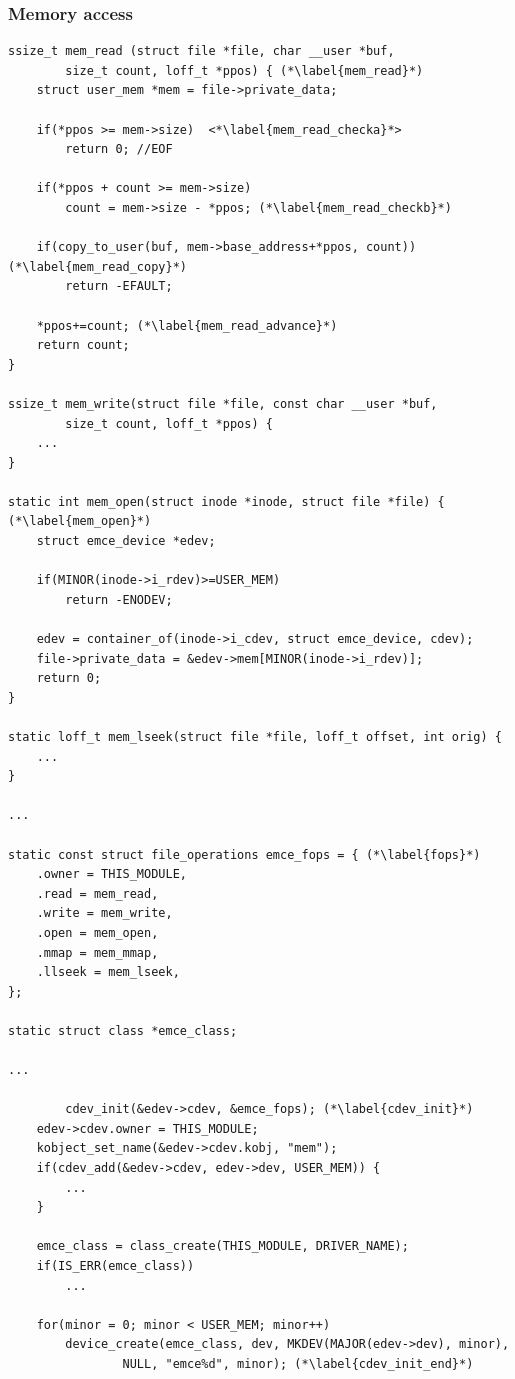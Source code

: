 \documentclass[12pt,a4paper,parskip=full,abstract=true,BCOR=12mm,twoside,open=right]{scrreprt}
\newcommand{\hack}{}
\begin{document}
\subsubsection{Memory access}
\begin{lstlisting}[float=htbp,caption={Character device},label=src:cdev,basicstyle=\hack\tiny]
ssize_t mem_read (struct file *file, char __user *buf,
		size_t count, loff_t *ppos) { (*\label{mem_read}*)
	struct user_mem *mem = file->private_data;

	if(*ppos >= mem->size)  <*\label{mem_read_checka}*>
		return 0; //EOF

	if(*ppos + count >= mem->size)
		count = mem->size - *ppos; (*\label{mem_read_checkb}*)

	if(copy_to_user(buf, mem->base_address+*ppos, count)) (*\label{mem_read_copy}*)
		return -EFAULT;

	*ppos+=count; (*\label{mem_read_advance}*)
	return count;
}

ssize_t mem_write(struct file *file, const char __user *buf,
		size_t count, loff_t *ppos) {
	...
}

static int mem_open(struct inode *inode, struct file *file) { (*\label{mem_open}*)
	struct emce_device *edev;

	if(MINOR(inode->i_rdev)>=USER_MEM)
		return -ENODEV;

	edev = container_of(inode->i_cdev, struct emce_device, cdev);
	file->private_data = &edev->mem[MINOR(inode->i_rdev)];
	return 0;
}

static loff_t mem_lseek(struct file *file, loff_t offset, int orig) {
	...
}

...

static const struct file_operations emce_fops = { (*\label{fops}*)
	.owner = THIS_MODULE,
	.read = mem_read,
	.write = mem_write,
	.open = mem_open,
	.mmap = mem_mmap,
	.llseek = mem_lseek,
};

static struct class *emce_class;

...

        cdev_init(&edev->cdev, &emce_fops); (*\label{cdev_init}*)
	edev->cdev.owner = THIS_MODULE;
	kobject_set_name(&edev->cdev.kobj, "mem");
	if(cdev_add(&edev->cdev, edev->dev, USER_MEM)) {
		...
	}

	emce_class = class_create(THIS_MODULE, DRIVER_NAME);
	if(IS_ERR(emce_class))
		...

	for(minor = 0; minor < USER_MEM; minor++)
		device_create(emce_class, dev, MKDEV(MAJOR(edev->dev), minor),
				NULL, "emce%d", minor); (*\label{cdev_init_end}*)
\end{lstlisting}
\end{document}
